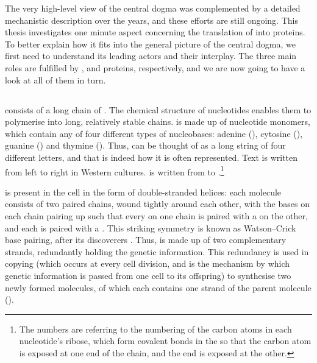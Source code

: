 The very high-level view of the central dogma was complemented by a detailed
mechanistic description over the years, and these efforts are still ongoing.
This thesis investigates one minute aspect concerning the translation of \rna
into proteins. To better explain how it fits into the general picture of the
central dogma, we first need to understand its leading actors and their
interplay. The three main roles are fulfilled by \dna, \rna and proteins,
respectively, and we are now going to have a look at all of them in turn.

\subsection{}

\dna consists of a long chain of .
The chemical structure of nucleotides enables them to polymerise into long,
relatively stable chains. \dna is made up of nucleotide monomers, which contain
any of four different types of nucleobases: adenine (\nA), cytosine (\nC),
guanine (\nG) and thymine (\nT). Thus, \dna can be thought of as a long string
of four different letters, and that is indeed how it is often represented. Text
is written from left to right in Western cultures. \dna is written from \fivep
to \threep.\footnote{The numbers are referring to the numbering of the carbon
atoms in each nucleotide’s ribose, which form covalent bonds in the \dna so that
the \fivep carbon atom is exposed at one end of the chain, and the \threep end
is exposed at the other.}

\dna is present in the cell in the form of double-stranded helices: each \dna
molecule consists of two paired chains, wound tightly around each other, with
the bases on each chain pairing up such that every \nA on one chain is paired
with a \nT on the other, and each \nC is paired with a \nG. This striking
symmetry is known as Watson–Crick base pairing, after its discoverers
\citep{Watson:1953}. Thus, \dna is made up of two complementary strands,
redundantly holding the genetic information. This redundancy is used in \dna
copying (which occurs at every cell division, and is the mechanism by which
genetic information is passed from one cell to its offspring) to synthesise two
newly formed \dna molecules, of which each contains one strand of the parent
\dna molecule ().

